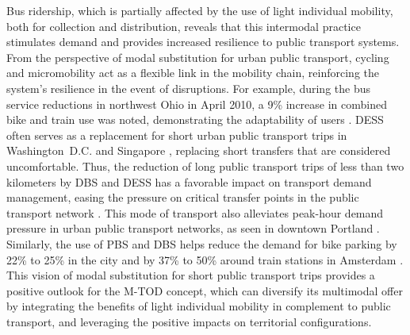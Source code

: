 \begin{refsegment}
Bus ridership, which is partially affected by the use of light individual mobility, both for collection and distribution, reveals that this intermodal practice stimulates demand and provides increased resilience to public transport systems. From the perspective of modal substitution for urban public transport, cycling and micromobility act as a flexible link in the mobility chain, reinforcing the system's resilience in the event of disruptions. For example, during the bus service reductions in northwest Ohio in April 2010, a 9\% increase in combined bike and train use was noted, demonstrating the adaptability of users \textcolor{blue}{\autocite[159]{flamm_changes_2014}}. \acrshort{DESS} often serves as a replacement for short urban public transport trips in Washington~D.C. \textcolor{blue}{\autocite[9]{yan_spatiotemporal_2021}} and Singapore \textcolor{blue}{\autocite[178]{cao_e-scooter_2021}}, replacing short transfers that are considered uncomfortable. Thus, the reduction of long public transport trips of less than two kilometers by \acrshort{DBS} and \acrshort{DESS} has a favorable impact on transport demand management, easing the pressure on critical transfer points in the public transport network \textcolor{blue}{\autocite[10]{jin_competition_2019}}. This mode of transport also alleviates peak-hour demand pressure in urban public transport networks, as seen in downtown Portland \textcolor{blue}{\autocite[101]{singleton_exploring_2014}}. Similarly, the use of \acrshort{PBS} and \acrshort{DBS} helps reduce the demand for bike parking by 22\% to 25\% in the city and by 37\% to 50\% around train stations in Amsterdam \textcolor{blue}{\autocite[2]{nat_bicycle_2018}}. This vision of modal substitution for short public transport trips provides a positive outlook for the \acrshort{M-TOD} concept, which can diversify its multimodal offer by integrating the benefits of light individual mobility in complement to public transport, and leveraging the positive impacts on territorial configurations.%


\end{refsegment}
